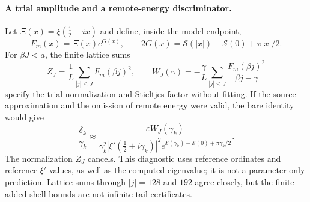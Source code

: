 \paragraph{A trial amplitude and a remote-energy discriminator.}
Let $\Xi(x)=\xi(\tfrac12+ix)$ and define, inside the model endpoint,
\[
 F_m(x)=\Xi(x)e^{G(x)},\qquad
 2G(x)=\mathcal S(|x|)-\mathcal S(0)+\pi|x|/2.
\]
For $\beta J<a$, the finite lattice sums
\[
 Z_J=\frac1L\sum_{|j|\leq J}F_m(\beta j)^2,\qquad
 W_J(\gamma)=-\frac\gamma L\sum_{|j|\leq J}
                 \frac{F_m(\beta j)^2}{\beta j-\gamma}
\]
specify the trial normalization and Stieltjes factor without fitting.
If the source approximation and the omission of remote energy were valid,
the bare identity would give
\[
 \frac{\delta_k}{\gamma_k}\approx
 \frac{\varepsilon W_J(\gamma_k)}
 {\gamma_k^2|\xi'(\tfrac12+i\gamma_k)|^2
  e^{\mathcal S(\gamma_k)-\mathcal S(0)+\pi\gamma_k/2}}.
\]
The normalization $Z_J$ cancels. This diagnostic uses reference ordinates
and reference $\xi'$ values, as well as the computed eigenvalue; it is
not a parameter-only prediction. Lattice sums through $|j|=128$ and
$192$ agree closely, but the finite added-shell bounds are not infinite
tail certificates.

